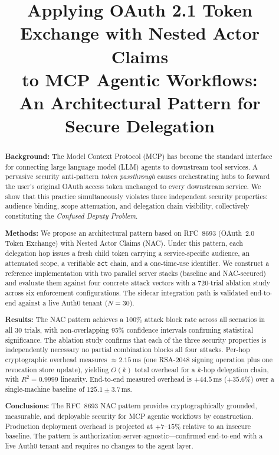 \documentclass[journal]{IEEEtran}
\begin{document}
\title{Applying OAuth 2.1 Token Exchange with Nested Actor Claims\\
to MCP Agentic Workflows:\\
An Architectural Pattern for Secure Delegation}

\author{
}

\maketitle
\begin{abstract}
\textbf{Background:}
The Model Context Protocol (MCP) has become the standard interface for connecting
large language model (LLM) agents to downstream tool services. A pervasive
security anti-pattern \textit{token passthrough} causes orchestrating hubs to
forward the user's original OAuth access token unchanged to every downstream
service. We show that this practice simultaneously violates three independent
security properties: audience binding, scope attenuation, and delegation chain
visibility, collectively constituting the \textit{Confused Deputy Problem}.

\textbf{Methods:}
We propose an architectural pattern based on RFC~8693 (OAuth~2.0 Token Exchange)
with Nested Actor Claims (NAC). Under this pattern, each delegation hop issues a
fresh child token carrying a service-specific audience, an attenuated scope, a
verifiable \texttt{act} chain, and a one-time-use identifier. We construct a
reference implementation with two parallel server stacks (baseline and NAC-secured)
and evaluate them against four concrete attack vectors with a 720-trial ablation
study across six enforcement configurations. The sidecar integration path is
validated end-to-end against a live Auth0 tenant ($N=30$).

\textbf{Results:}
The NAC pattern achieves a 100\% attack block rate across all scenarios in all
30 trials, with non-overlapping 95\% confidence intervals confirming statistical
significance. The ablation study confirms that each of the three security
properties is independently necessary no partial combination blocks all four
attacks. Per-hop cryptographic overhead measures $\approx 2.15$\,ms (one
RSA-2048 signing operation plus one revocation store update), yielding $O(k)$
total overhead for a $k$-hop delegation chain, with $R^2 = 0.9999$ linearity.
End-to-end measured overhead is $+44.5$\,ms ($+35.6\%$) over a single-machine
baseline of $125.1 \pm 3.7$\,ms.

\textbf{Conclusions:}
The RFC~8693 NAC pattern provides cryptographically grounded, measurable, and
deployable security for MCP agentic workflows by construction. Production
deployment overhead is projected at $+7$--$15\%$ relative to an insecure
baseline. The pattern is authorization-server-agnostic---confirmed end-to-end with a live
Auth0 tenant and requires no changes to the agent layer.
\end{abstract}
\end{document}
